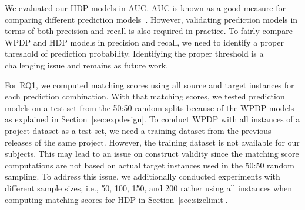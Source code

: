 We evaluated our HDP models in AUC.
	AUC is known as a good measure for comparing different prediction
	models~\cite{Giger12,Lessmann08,Rahman12,Song11}. However, validating
	prediction models in terms of both precision and recall is also required in
	practice. To fairly compare WPDP and HDP models in precision
	and recall, we need to identify a proper threshold of prediction probability.
	Identifying the proper threshold is a challenging issue and remains as
	future work.

For RQ1, we computed matching scores using all
	source and target instances for each prediction combination.
	With that matching scores, we tested prediction models on a test set from the 50:50 random splits because of the WPDP models as explained in Section~\ref{sec:expdesign}.
	To conduct WPDP with all instances of a project dataset as a test set, we need a training dataset from the previous releases of the same project. However, the training dataset is not
	available for our subjects. This may lead to an issue on construct validity since the matching score computations are not based on actual target instances used in the 50:50 random sampling. To address this issue, we additionally conducted experiments with different sample sizes, i.e., 50, 100, 150, and 200 rather using all instances when computing matching scores for HDP in Section~\ref{sec:sizelimit}.
	


